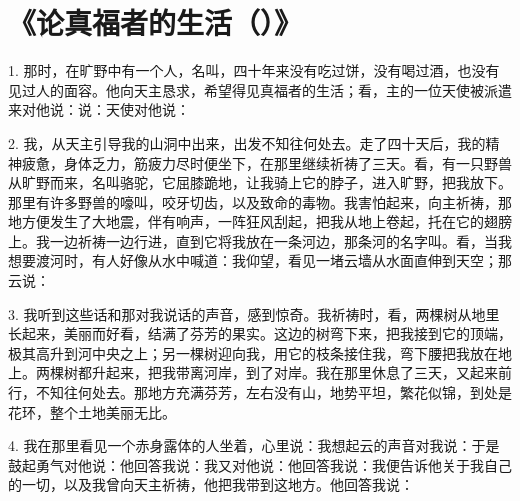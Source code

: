
\chapter{《论真福者的生活（）》}


1. 那时，在旷野中有一个人，名叫，四十年来没有吃过饼，没有喝过酒，也没有见过人的面容。他向天主恳求，希望得见真福者的生活；看，主的一位天使被派遣来对他说：说：天使对他说：\par

2. 我，从天主引导我的山洞中出来，出发不知往何处去。走了四十天后，我的精神疲惫，身体乏力，筋疲力尽时便坐下，在那里继续祈祷了三天。看，有一只野兽从旷野而来，名叫骆驼，它屈膝跪地，让我骑上它的脖子，进入旷野，把我放下。那里有许多野兽的嚎叫，咬牙切齿，以及致命的毒物。我害怕起来，向主祈祷，那地方便发生了大地震，伴有响声，一阵狂风刮起，把我从地上卷起，托在它的翅膀上。我一边祈祷一边行进，直到它将我放在一条河边，那条河的名字叫。看，当我想要渡河时，有人好像从水中喊道：我仰望，看见一堵云墙从水面直伸到天空；那云说：\par

3. 我听到这些话和那对我说话的声音，感到惊奇。我祈祷时，看，两棵树从地里长起来，美丽而好看，结满了芬芳的果实。这边的树弯下来，把我接到它的顶端，极其高升到河中央之上；另一棵树迎向我，用它的枝条接住我，弯下腰把我放在地上。两棵树都升起来，把我带离河岸，到了对岸。我在那里休息了三天，又起来前行，不知往何处去。那地方充满芬芳，左右没有山，地势平坦，繁花似锦，到处是花环，整个土地美丽无比。\par

4. 我在那里看见一个赤身露体的人坐着，心里说：我想起云的声音对我说：于是鼓起勇气对他说：他回答我说：我又对他说：他回答我说：我便告诉他关于我自己的一切，以及我曾向天主祈祷，他把我带到这地方。他回答我说：\par

